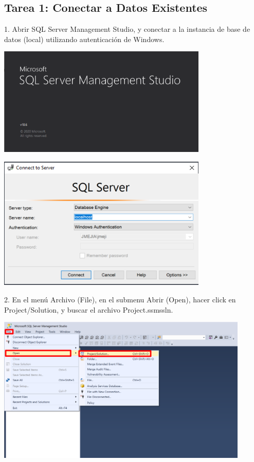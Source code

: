 \documentclass[12pt,letterpaper]{article}
\begin{document}
\subsection*{Tarea 1: Conectar a Datos Existentes}
1. Abrir SQL Server Management Studio, y conectar a la instancia de base de datos (local) utilizando
autenticación de Windows.
\begin{center}
    \includegraphics[width=10cm]{img/1.png}  
\end{center}
\begin{center}
    \includegraphics[width=10cm]{img/2.png}  
\end{center}
2. En el menú Archivo (File), en el submenu Abrir (Open), hacer click en Project/Solution, y buscar el archivo
Project.ssmssln.
\begin{center}
    \includegraphics[width=12cm]{img/3.png}
    \vspace{1cm}  
\end{center}
\end{document}
